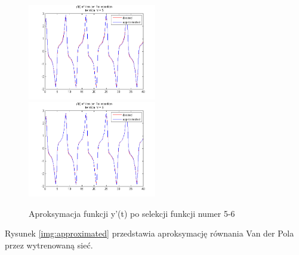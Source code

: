 \begin{figure}[ht!]
	\centering
	
	\subfloat
	{\includegraphics[width=0.5\textwidth]
	{images/deriv_iter5.png}}
	\subfloat
	{\includegraphics[width=0.5\textwidth]
	{images/deriv_iter6.png}}	
	
	\caption{Aproksymacja funkcji y'(t) po selekcji funkcji numer 5-6}		
	\label{fig:deriv_approx_b}
\end{figure}

Rysunek \ref{img:approximated} przedstawia aproksymację równania Van der Pola przez wytrenowaną sieć.

